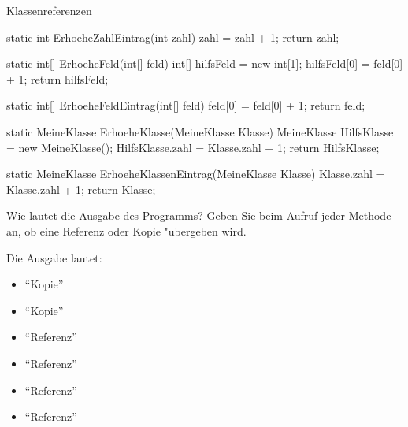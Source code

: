 \begin{exercise}{Klassenreferenzen}
\begin{body}
\begin{displaycode}
static int ErhoeheZahlEintrag(int zahl) {
  zahl = zahl + 1;
  return zahl;
}

static int[] ErhoeheFeld(int[] feld) {
  int[] hilfsFeld = new int[1];
  hilfsFeld[0] = feld[0] + 1;
  return hilfsFeld;
}

static int[] ErhoeheFeldEintrag(int[] feld) {
  feld[0] = feld[0] + 1;
  return feld;
}

static MeineKlasse ErhoeheKlasse(MeineKlasse Klasse) {
  MeineKlasse HilfsKlasse = new MeineKlasse();
  HilfsKlasse.zahl = Klasse.zahl + 1;
  return HilfsKlasse;
}

static MeineKlasse ErhoeheKlassenEintrag(MeineKlasse Klasse) {
  Klasse.zahl = Klasse.zahl + 1;
  return Klasse;
}
\end{displaycode}
Wie lautet die Ausgabe des Programms? Geben Sie beim Aufruf jeder Methode an, ob eine Referenz oder Kopie "ubergeben wird.

\end{body}
\begin{solution}
Die Ausgabe lautet:
 \begin{itemize}
  \item {} ``Kopie''
  \item {} ``Kopie''
  \item {} ``Referenz''
  \item {} ``Referenz''
  \item {} ``Referenz''
  \item {} ``Referenz''
 \end{itemize}

\end{solution}
\end{exercise}
